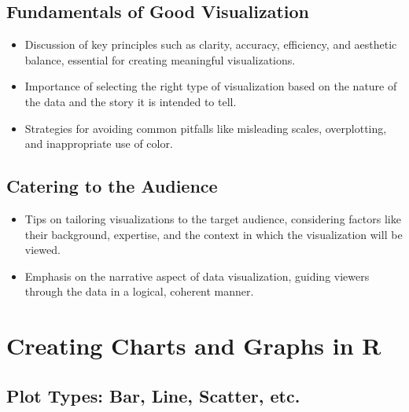 \documentclass[
]{book}
\begin{document}
\hypertarget{fundamentals-of-good-visualization}{%
\subsection*{Fundamentals of Good Visualization}\label{fundamentals-of-good-visualization}}

\begin{itemize}
\item
  Discussion of key principles such as clarity, accuracy, efficiency, and aesthetic balance, essential for creating meaningful visualizations.
\item
  Importance of selecting the right type of visualization based on the nature of the data and the story it is intended to tell.
\item
  Strategies for avoiding common pitfalls like misleading scales, overplotting, and inappropriate use of color.
\end{itemize}

\hypertarget{catering-to-the-audience}{%
\subsection*{Catering to the Audience}\label{catering-to-the-audience}}

\begin{itemize}
\item
  Tips on tailoring visualizations to the target audience, considering factors like their background, expertise, and the context in which the visualization will be viewed.
\item
  Emphasis on the narrative aspect of data visualization, guiding viewers through the data in a logical, coherent manner.
\end{itemize}

\hypertarget{creating-charts-and-graphs-in-r}{%
\section*{Creating Charts and Graphs in R}\label{creating-charts-and-graphs-in-r}}

\hypertarget{plot-types-bar-line-scatter-etc.}{%
\subsection*{Plot Types: Bar, Line, Scatter, etc.}\label{plot-types-bar-line-scatter-etc.}}
\end{document}
